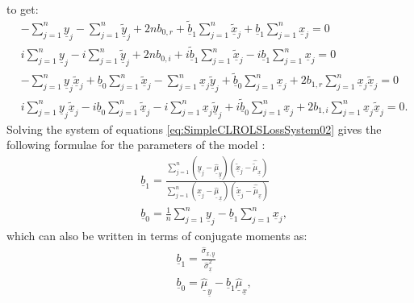 \documentclass[
]{book}
\begin{document}
to get:
\begin{equation}
    \begin{aligned}
        & - \sum_{j=1}^n \underline{y}_j - \sum_{j=1}^n \underline{\tilde{y}}_j + 2 n b_{0,r} + \underline{\tilde{b}}_1 \sum_{j=1}^n \underline{\tilde{x}}_j + \underline{b}_1 \sum_{j=1}^n \underline{x}_j = 0 \\
        & i \sum_{j=1}^n \underline{y}_j - i \sum_{j=1}^n \underline{\tilde{y}}_j + 2 n b_{0,i} + i \underline{\tilde{b}}_1 \sum_{j=1}^n \underline{\tilde{x}}_j - i \underline{b}_1 \sum_{j=1}^n \underline{x}_j = 0 \\
        & - \sum_{j=1}^n \underline{y}_j \underline{\tilde{x}}_j + \underline{b}_0 \sum_{j=1}^n \underline{\tilde{x}}_j - \sum_{j=1}^n \underline{x}_j \underline{\tilde{y}}_j + \underline{\tilde{b}}_0 \sum_{j=1}^n \underline{x}_j + 2 b_{1,r} \sum_{j=1}^n \underline{x}_j \underline{\tilde{x}}_j = 0 \\
        & i \sum_{j=1}^n \underline{y}_j \underline{\tilde{x}}_j - i \underline{b}_0 \sum_{j=1}^n \underline{\tilde{x}}_j - i \sum_{j=1}^n \underline{x}_j \underline{\tilde{y}}_j + i \underline{\tilde{b}}_0 \sum_{j=1}^n \underline{x}_j + 2 b_{1,i} \sum_{j=1}^n \underline{x}_j \underline{\tilde{x}}_j = 0 .
    \end{aligned}
    \label{eq:SimpleCLROLSLossSystem02}
\end{equation}
Solving the system of equations \eqref{eq:SimpleCLROLSLossSystem02} gives the following formulae for the parameters of the model \citep{Svetunkov2012}:
\begin{equation}
    \begin{aligned}
        & \underline{b}_1 = \frac{\sum_{j=1}^n (\underline{y}_j-\underline{\hat{\mu}}_{\underline{y}}) (\underline{\tilde{x}}_j-\hat{\tilde{\mu}}_{\underline{x}})}{\sum_{j=1}^n (\underline{x}_j-\underline{\hat{\mu}}_{\underline{x}}) (\underline{\tilde{x}}_j-\hat{\tilde{\mu}}_{\underline{x}})} \\
        & \underline{b}_0 = \frac{1}{n} \sum_{j=1}^n \underline{y}_j - \underline{b}_1 \sum_{j=1}^n \underline{x}_j ,
    \end{aligned}
    \label{eq:SimpleCLROLSLossParameters}
\end{equation}
which can also be written in terms of conjugate moments as:
\begin{equation}
    \begin{aligned}
        & \underline{b}_1 = \frac{\hat{\sigma}_{\underline{x},\underline{y}}}{\hat{\sigma}_{\underline{x}}^2} \\
        & \underline{b}_0 = \underline{\hat{\mu}}_{\underline{y}} - \underline{b}_1 \underline{\hat{\mu}}_{\underline{x}} ,
    \end{aligned}
    \label{eq:SimpleCLROLSLossParametersMoments}
\end{equation}
\end{document}
